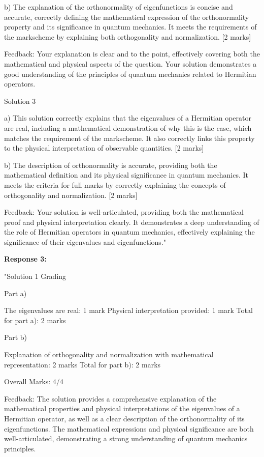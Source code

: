 \documentclass[a4paper,11pt]{article}
\begin{document}
b) The explanation of the orthonormality of eigenfunctions is concise and accurate, correctly defining the mathematical expression of the orthonormality property and its significance in quantum mechanics. It meets the requirements of the markscheme by explaining both orthogonality and normalization. [2 marks]

Feedback: Your explanation is clear and to the point, effectively covering both the mathematical and physical aspects of the question. Your solution demonstrates a good understanding of the principles of quantum mechanics related to Hermitian operators.

Solution 3

a) This solution correctly explains that the eigenvalues of a Hermitian operator are real, including a mathematical demonstration of why this is the case, which matches the requirement of the markscheme. It also correctly links this property to the physical interpretation of observable quantities. [2 marks]

b) The description of orthonormality is accurate, providing both the mathematical definition and its physical significance in quantum mechanics. It meets the criteria for full marks by correctly explaining the concepts of orthogonality and normalization. [2 marks]

Feedback: Your solution is well-articulated, providing both the mathematical proof and physical interpretation clearly. It demonstrates a deep understanding of the role of Hermitian operators in quantum mechanics, effectively explaining the significance of their eigenvalues and eigenfunctions."

\textbf{Response 3:}

"Solution 1 Grading

Part a)

The eigenvalues are real: 1 mark
Physical interpretation provided: 1 mark
Total for part a): 2 marks

Part b)

Explanation of orthogonality and normalization with mathematical representation: 2 marks
Total for part b): 2 marks

Overall Marks: 4/4

Feedback: The solution provides a comprehensive explanation of the mathematical properties and physical interpretations of the eigenvalues of a Hermitian operator, as well as a clear description of the orthonormality of its eigenfunctions. The mathematical expressions and physical significance are both well-articulated, demonstrating a strong understanding of quantum mechanics principles.
\end{document}
